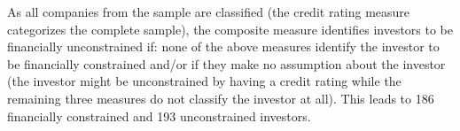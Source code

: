 \documentclass[12pt]{article}
\begin{document}
As all companies from the sample are classified (the credit rating measure categorizes the complete sample), the composite measure identifies investors to be financially unconstrained if: none of the above measures identify the investor to be financially constrained and/or if they make no assumption about the investor (the investor might be unconstrained by having a credit rating while the remaining three measures do not classify the investor at all). This leads to 186 financially constrained and 193 unconstrained investors.\par
\end{document}
